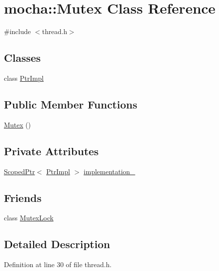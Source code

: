 \hypertarget{classmocha_1_1_mutex}{
\section{mocha::Mutex Class Reference}
\label{classmocha_1_1_mutex}
}


{\ttfamily \#include $<$thread.h$>$}

\subsection*{Classes}
\begin{DoxyCompactItemize}
\item 
class \hyperlink{classmocha_1_1_mutex_1_1_ptr_impl}{PtrImpl}
\end{DoxyCompactItemize}
\subsection*{Public Member Functions}
\begin{DoxyCompactItemize}
\item 
\hyperlink{classmocha_1_1_mutex_ab162f5316a40dd5f5f172ed9a67fcb97}{Mutex} ()
\end{DoxyCompactItemize}
\subsection*{Private Attributes}
\begin{DoxyCompactItemize}
\item 
\hyperlink{classmocha_1_1_scoped_ptr}{ScopedPtr}$<$ \hyperlink{classmocha_1_1_mutex_1_1_ptr_impl}{PtrImpl} $>$ \hyperlink{classmocha_1_1_mutex_abfc2fb666752bd57ea378014299821d7}{implementation\_\-}
\end{DoxyCompactItemize}
\subsection*{Friends}
\begin{DoxyCompactItemize}
\item 
class \hyperlink{classmocha_1_1_mutex_a7177018259362468923e579d8525b5d5}{MutexLock}
\end{DoxyCompactItemize}


\subsection{Detailed Description}


Definition at line 30 of file thread.h.



